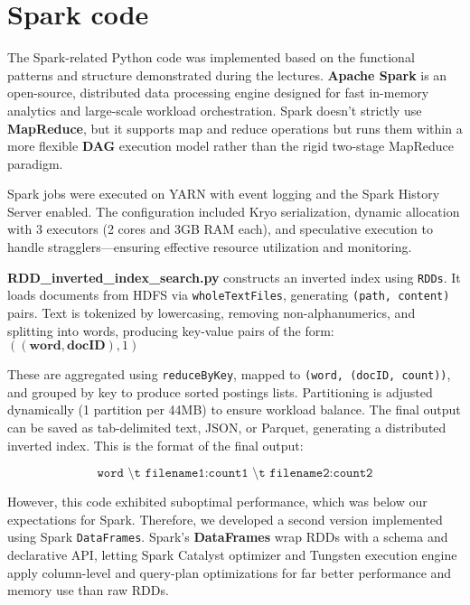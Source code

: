 \section{Spark code}
The Spark-related Python code was implemented based on the functional patterns and structure demonstrated during the lectures. \textbf{Apache Spark} is an open-source, distributed data processing engine designed for fast in-memory analytics and large-scale workload orchestration. Spark doesn’t strictly use \textbf{MapReduce}, but it supports map and reduce operations but runs them within a more flexible \textbf{DAG} execution model rather than the rigid two-stage MapReduce paradigm.

\vspace{4mm}

Spark jobs were executed on YARN with event logging and the Spark History Server enabled. The configuration included Kryo serialization, dynamic allocation with 3 executors (2 cores and 3GB RAM each), and speculative execution to handle stragglers—ensuring effective resource utilization and monitoring.

\vspace{4mm}

\textbf{RDD\_inverted\_index\_search.py} constructs an inverted index using \texttt{RDDs}. It loads documents from HDFS via \texttt{wholeTextFiles}, generating \texttt{(path, content)} pairs. Text is tokenized by lowercasing, removing non-alphanumerics, and splitting into words, producing key-value pairs of the form: $ ((\textbf{word}, \textbf{docID}), 1) $

These are aggregated using \texttt{reduceByKey}, mapped to \texttt{(word, (docID, count))}, and grouped by key to produce sorted postings lists. Partitioning is adjusted dynamically (1 partition per 44MB) to ensure workload balance. The final output can be saved as tab-delimited text, JSON, or Parquet, generating a distributed inverted index. This is the format of the final output:

\[
\texttt{word \textbackslash t filename1:count1 \textbackslash t filename2:count2}
\]

However, this code exhibited suboptimal performance, which was below our expectations for Spark. Therefore, we developed a second version implemented using Spark \texttt{DataFrames}. Spark's \textbf{DataFrames} wrap RDDs with a schema and declarative API, letting Spark Catalyst optimizer and Tungsten execution engine apply column-level and query-plan optimizations for far better performance and memory use than raw RDDs. 

